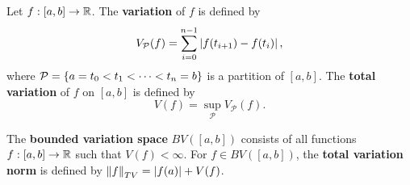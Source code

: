 \begin{definition}
    Let $f:[a,b]\to\mathbb{R}$. The \textbf{variation} of $f$ is defined by 
    \begin{equation*}
        V_{\mathcal{P}}(f) = \sum_{i=0}^{n-1} \left\lvert {f(t_{i+1})-f(t_i)} \right\rvert,
    \end{equation*}
    where $\mathcal{P} = \left\{ {a=t_0<t_1<\cdots<t_n=b} \right\}$ is a partition 
    of $[a,b]$. The \textbf{total variation} of $f$ on $[a,b]$ is defined by 
    \begin{equation*}
        V(f) = \sup_{\mathcal{P}} V_{\mathcal{P}}(f).
    \end{equation*}
\end{definition}

\begin{definition}
    The \textbf{bounded variation space} $BV([a,b])$ consists of all 
    functions $f:[a,b]\to\mathbb{R}$ such that $V(f)<\infty$. For $f\in BV([a,b])$, 
    the \textbf{total variation norm} is defined by $\left\lVert {f} \right\rVert_{TV} 
    = \left\lvert {f(a)} \right\rvert + V(f)$.
\end{definition}

